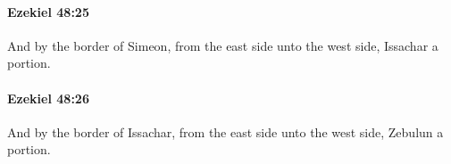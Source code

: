 		\paragraph{Ezekiel 48:25} %
			\label{EZEKIEL-48-25}

			And by the border of Simeon, from the east side unto the west side, Issachar a portion.


		\paragraph{Ezekiel 48:26} %
			\label{EZEKIEL-48-26}

			And by the border of Issachar, from the east side unto the west side, Zebulun a portion.


